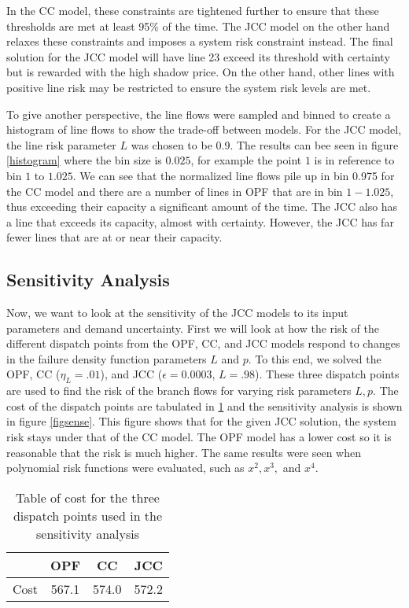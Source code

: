 In the CC model, these constraints are tightened further to ensure that these thresholds are met at least 95\% of the time.  The JCC model on the other hand relaxes these constraints and imposes a system risk constraint instead.  The final solution for the JCC model will have line 23 exceed its threshold with certainty but is rewarded with the high shadow price.  On the other hand, other lines with positive line risk may be restricted to ensure the system risk levels are met.

To give another perspective, the line flows were sampled and binned to create a histogram of line flows to show the trade-off between models.  For the JCC model, the line risk parameter $L$ was chosen to be 0.9.  The results can bee seen in figure \ref{histogram} where the bin size is $0.025$, for example the point $1$ is in reference to bin $1$ to $1.025$.  We can see that the normalized line flows pile up in bin 0.975 for the CC model and there are a number of lines in OPF that are in bin $1-1.025$, thus exceeding their capacity a significant amount of the time.  The JCC also has a line that exceeds its capacity, almost with certainty.  However, the JCC has far fewer lines that are at or near their capacity.



\subsection{Sensitivity Analysis}\label{senseanal}
Now, we want to look at the sensitivity of the JCC models to its input parameters and demand uncertainty.  First we will look at how the risk of the different dispatch points from the OPF, CC, and JCC models respond to changes in the failure density function parameters $L$ and $p$.  To this end, we solved the OPF, CC ($\eta_L=.01$), and JCC ($\epsilon=0.0003$, $L=.98$).  These three dispatch points are used to find the risk of the branch flows for varying risk parameters $L,p$. The cost of the dispatch points are tabulated in \ref{tabsense} and the sensitivity analysis is shown in figure \ref{figsense}. This figure shows that for the given JCC solution, the system risk stays under that of the CC model.  The OPF model has a lower cost so it is reasonable that the risk is much higher.  The same results were seen when polynomial risk functions were evaluated, such as $x^2,x^3,$ and $x^4$.


\begin{table}
\centering
 \begin{tabular}{ |c| c c c |}
\hline
& OPF & CC & JCC \\
\hline
\hline
Cost & 567.1 & 574.0 & 572.2\\
\hline
\end{tabular}
\caption{Table of cost for the three dispatch points used in the sensitivity analysis}\label{tabsense}
\end{table}


